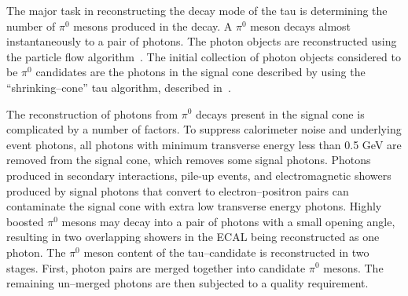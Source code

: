 The major task in reconstructing the decay mode of the tau is determining the
number of $\pi^0$ mesons produced in the decay.  A $\pi^0$ meson decays almost
instantaneously to a pair of photons.  The photon objects are reconstructed using the
particle flow algorithm~\cite{CMS-PAS-PFT-09-001}. The initial collection of
photon objects considered to be $\pi^0$ candidates are the photons in the signal
cone described by using the ``shrinking--cone'' tau algorithm, described
in~\cite{CMS-PAS-PFT-08-001}.  

The reconstruction of photons from $\pi^0$ decays present in the signal cone is
complicated by a number of factors.  To suppress calorimeter noise and underlying
event photons, all photons with minimum transverse energy less than 0.5 GeV are
removed from the signal cone, which removes some signal photons.  Photons
produced in secondary interactions, pile-up events, and electromagnetic showers
produced by signal photons that convert to electron--positron pairs can
contaminate the signal cone with extra low transverse energy photons.  Highly
boosted $\pi^0$ mesons may decay into a pair of photons with a small opening
angle, resulting in two overlapping showers in the ECAL being reconstructed as
one photon.  The $\pi^0$ meson content of the tau--candidate is reconstructed in
two stages.  First, photon pairs are merged together into candidate $\pi^0$
mesons.  The remaining un--merged photons are then subjected to a quality
requirement.

